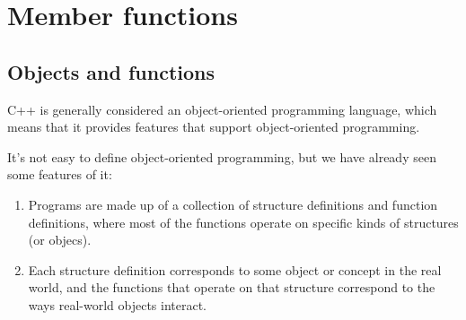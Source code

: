 





\chapter{Member functions}

\section{Objects and functions}

C++ is generally considered an object-oriented programming language,
which means that it provides features that support object-oriented
programming.

It's not easy to define object-oriented programming, but we have
already seen some features of it:

\begin{enumerate}

\item Programs are made up of a collection of structure definitions
and function definitions, where most of the functions operate on
specific kinds of structures (or objecs).

\item Each structure definition corresponds to some
object or concept in the real world, and the functions that operate
on that structure correspond to the ways real-world objects interact.

\end{enumerate}

